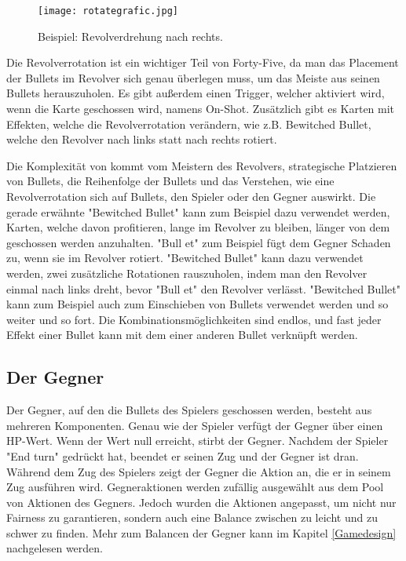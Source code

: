 \begin{figure}[H]
    \texttt{[image: rotategrafic.jpg]}
    \caption{Beispiel: Revolverdrehung nach rechts.}
\end{figure}


Die Revolverrotation ist ein wichtiger Teil von Forty-Five, da man das Placement der Bullets im Revolver sich genau überlegen muss,
um das Meiste aus seinen Bullets herauszuholen.
Es gibt außerdem einen Trigger, welcher aktiviert wird, wenn die Karte geschossen wird,
namens On-Shot. Zusätzlich gibt es Karten mit Effekten, welche die Revolverrotation verändern, wie z.B. Bewitched Bullet,
welche den Revolver nach links statt nach rechts rotiert.

Die Komplexität von \FF kommt vom Meistern des Revolvers, strategische Platzieren von Bullets, die Reihenfolge der Bullets und das Verstehen,
wie eine Revolverrotation sich auf Bullets, den Spieler oder den Gegner auswirkt.
Die gerade erwähnte "Bewitched Bullet" kann zum Beispiel dazu verwendet werden, Karten,
welche davon profitieren, lange im Revolver zu bleiben, länger von dem geschossen werden anzuhalten. "Bull et" zum Beispiel fügt dem Gegner Schaden zu,
wenn sie im Revolver rotiert.%
"Bewitched Bullet" kann dazu verwendet werden, zwei zusätzliche Rotationen rauszuholen, indem man den Revolver einmal nach
links dreht, bevor "Bull et" den Revolver verlässt. "Bewitched Bullet" kann zum Beispiel auch zum Einschieben von Bullets verwendet
werden und so weiter und so fort. Die Kombinationsmöglichkeiten sind endlos, und fast jeder Effekt einer Bullet kann mit dem einer
anderen Bullet verknüpft werden.


\subsection{Der Gegner}\label{der_gegner}
Der Gegner, auf den die Bullets des Spielers geschossen werden, besteht aus mehreren Komponenten.
Genau wie der Spieler verfügt der Gegner über einen HP-Wert. Wenn der Wert null erreicht, stirbt der Gegner.
Nachdem der Spieler "End turn" gedrückt hat, beendet er seinen Zug und der Gegner ist dran. Während dem Zug des Spielers
zeigt der Gegner die Aktion an, die er in seinem Zug ausführen wird.
Gegneraktionen werden zufällig ausgewählt aus dem Pool von Aktionen des Gegners.
Jedoch wurden die Aktionen angepasst, um nicht nur Fairness zu garantieren,
sondern auch eine Balance zwischen zu leicht und zu schwer zu finden.
Mehr zum Balancen der Gegner kann im Kapitel \ref{Gamedesign} nachgelesen werden.


